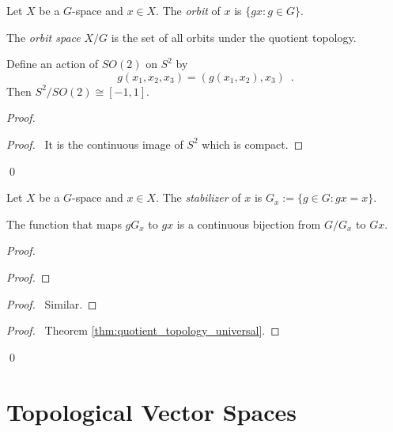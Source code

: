 \begin{df}[Orbit]
Let $X$ be a $G$-space and $x \in X$. The \emph{orbit} of $x$ is $\{ gx : g \in G \}$.

The \emph{orbit space} $X / G$ is the set of all orbits under the quotient topology.
\end{df}

\begin{prop}
Define an action of $SO(2)$ on $S^2$ by 
\[ g(x_1, x_2, x_3) = (g(x_1, x_2), x_3) \enspace . \] Then $S^2 / SO(2) \cong [-1,1]$.
\end{prop}

\begin{proof}
\pf
{}
\begin{proof}
	\pf\ It is the continuous image of $S^2$ which is compact.
\end{proof}
\qed
\end{proof}

\begin{df}[Stabilizer]
Let $X$ be a $G$-space and $x \in X$. The \emph{stabilizer} of $x$ is $G_x := \{ g \in G : gx = x \}$.
\end{df}

\begin{prop}
The function that maps $gG_x$ to $gx$ is a continuous bijection from $G / G_x$ to $Gx$.
\end{prop}

\begin{proof}
\pf
{}
\begin{proof}
\end{proof}
\begin{proof}
	\pf\ Similar.
\end{proof}
\begin{proof}
	\pf\ Theorem \ref{thm:quotient_topology_universal}.
\end{proof}
\qed
\end{proof}

\chapter{Topological Vector Spaces}

